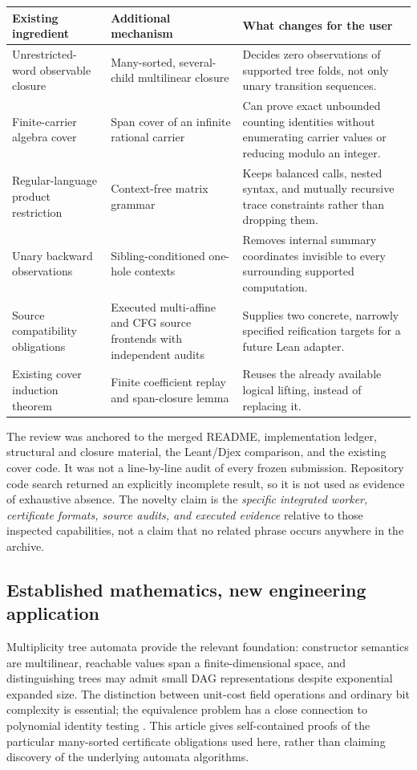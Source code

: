 \documentclass[11pt,letterpaper]{article}
\theoremstyle{definition}\newtheorem{definition}[theorem]{Definition}
\theoremstyle{remark}\newtheorem{remark}[theorem]{Remark}
\begin{document}
\begin{longtable}{@{}>{\raggedright\arraybackslash}p{}>{\raggedright\arraybackslash}p{}>{\raggedright\arraybackslash}p{}@{}}
\toprule
Existing ingredient & Additional mechanism & What changes for the user\\
\midrule\endhead
Unrestricted-word observable closure & Many-sorted, several-child multilinear closure & Decides zero observations of supported tree folds, not only unary transition sequences.\\
Finite-carrier algebra cover & Span cover of an infinite rational carrier & Can prove exact unbounded counting identities without enumerating carrier values or reducing modulo an integer.\\
Regular-language product restriction & Context-free matrix grammar & Keeps balanced calls, nested syntax, and mutually recursive trace constraints rather than dropping them.\\
Unary backward observations & Sibling-conditioned one-hole contexts & Removes internal summary coordinates invisible to every surrounding supported computation.\\
Source compatibility obligations & Executed multi-affine and CFG source frontends with independent audits & Supplies two concrete, narrowly specified reification targets for a future Lean adapter.\\
Existing cover induction theorem & Finite coefficient replay and span-closure lemma & Reuses the already available logical lifting, instead of replacing it.\\
\bottomrule
\end{longtable}

The review was anchored to the merged README, implementation ledger, structural and closure material, the Leant/Djex comparison, and the existing cover code. It was not a line-by-line audit of every frozen submission. Repository code search returned an explicitly incomplete result, so it is not used as evidence of exhaustive absence. The novelty claim is the \emph{specific integrated worker, certificate formats, source audits, and executed evidence} relative to those inspected capabilities, not a claim that no related phrase occurs anywhere in the archive.

\subsection{Established mathematics, new engineering application}
Multiplicity tree automata provide the relevant foundation: constructor semantics are multilinear, reachable values span a finite-dimensional space, and distinguishing trees may admit small DAG representations despite exponential expanded size. The distinction between unit-cost field operations and ordinary bit complexity is essential; the equivalence problem has a close connection to polynomial identity testing \cite{marusic}. This article gives self-contained proofs of the particular many-sorted certificate obligations used here, rather than claiming discovery of the underlying automata algorithms.
\end{document}
